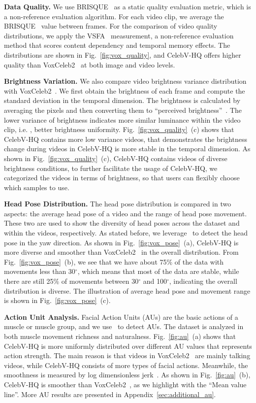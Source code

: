  \textbf{Data Quality. } We use BRISQUE~\cite{brisque} as a static quality evaluation metric, which is a non-reference evaluation algorithm. For each video clip, we average the BRISQUE~\cite{brisque} value between frames. For the comparison of video quality distributions, we apply the VSFA~\cite{videoquality} measurement, a non-reference evaluation method that scores content dependency and temporal memory effects. The distributions are shown in Fig.~\ref{fig:vox_quality}, and CelebV-HQ offers higher quality than VoxCeleb2~\cite{vox2} at both image and video levels. 

 \textbf{Brightness Variation. } We also compare video brightness variance distribution with VoxCeleb2~\cite{vox2}. We first obtain the brightness of each frame and compute the standard deviation in the temporal dimension. The brightness is calculated by averaging the pixels and then converting them to ``perceived brightness''~\cite{bezryadin2007brightness}. The lower variance of brightness indicates more similar luminance within the video clip, i.e. , better brightness uniformity. Fig.~\ref{fig:vox_quality}~(c) shows that CelebV-HQ contains more low variance videos, that demonstrates the brightness change during videos in CelebV-HQ is more stable in the temporal dimension. As shown in Fig.~\ref{fig:vox_quality}~(c), CelebV-HQ contains videos of diverse brightness conditions, to further facilitate the usage of CelebV-HQ, we categorized the videos in terms of brightness, so that users can flexibly choose which samples to use. 

 \textbf{Head Pose Distribution.} The head pose distribution is compared in two aspects: the average head pose of a video and the range of head pose movement. These two are used to show the diversity of head poses across the dataset and within the videos, respectively. As stated before, we leverage~\cite{wu2018look} to detect the head pose in the yaw direction. As shown in Fig.~\ref{fig:vox_pose}~(a), CelebV-HQ is more diverse and smoother than VoxCeleb2~\cite{vox2} in the overall distribution. From Fig.~\ref{fig:vox_pose}~(b), we see that we have about 75\% of the data with movements less than 30$^{\circ}$, which means that most of the data are stable, while there are still 25\% of movements between 30$^{\circ}$ and 100$^{\circ}$, indicating the overall distribution is diverse. The illustration of average head pose and  movement range is shown in Fig.~\ref{fig:vox_pose}~(c).

 \textbf{Action Unit Analysis.} Facial Action Units (AUs) are the basic actions of a muscle or muscle group, and we use~\cite{fan2020fau} to detect AUs. The dataset is analyzed in both muscle movement richness and naturalness.
Fig.~\ref{fig:au}~(a) shows that CelebV-HQ is more uniformly distributed over different AU values that represents action strength. The main reason is that videos in VoxCeleb2~\cite{vox2} are mainly talking videos, while CelebV-HQ consists of more types of facial actions. Meanwhile, the smoothness is measured by log dimensionless jerk~\cite{ldljerk}. As shown in Fig.~\ref{fig:au}~(b), CelebV-HQ is smoother than VoxCeleb2~\cite{vox2}, as we highlight with the ``Mean value line''. More AU results are presented in Appendix~\ref{sec:additional_au}.

